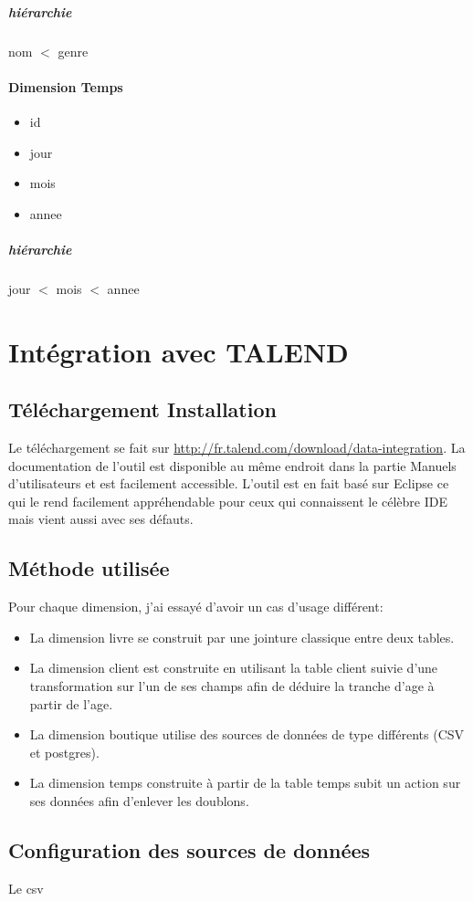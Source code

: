 \subparagraph{hiérarchie}
nom $<$ genre

\paragraph{Dimension Temps}

\begin{itemize}
\item id
\item jour
\item mois
\item annee
\end{itemize}

\subparagraph{hiérarchie}
jour $<$ mois $<$ annee

\section{Intégration avec TALEND}

\subsection{Téléchargement Installation}
Le téléchargement se fait sur \url{http://fr.talend.com/download/data-integration}.
La documentation de l'outil est disponible au même endroit dans la partie Manuels d'utilisateurs et est facilement accessible.
L'outil est en fait basé sur Eclipse ce qui le rend facilement appréhendable pour ceux qui connaissent le célèbre IDE mais vient aussi avec ses défauts.

\subsection{Méthode utilisée}

Pour chaque dimension, j'ai essayé d'avoir un cas d'usage différent:
\begin{itemize}
\item La dimension livre se construit par une jointure classique entre deux tables. 
\item La dimension client est construite en utilisant la table client suivie d'une transformation sur l'un de ses champs afin de déduire la tranche d'age à partir de l'age.
\item La dimension boutique utilise des sources de données de type différents (CSV et postgres).
\item La dimension temps construite à partir de la table temps subit un action sur ses données afin d'enlever les doublons.
\end{itemize}

\subsection{Configuration des sources de données}
Le csv
\clearpage